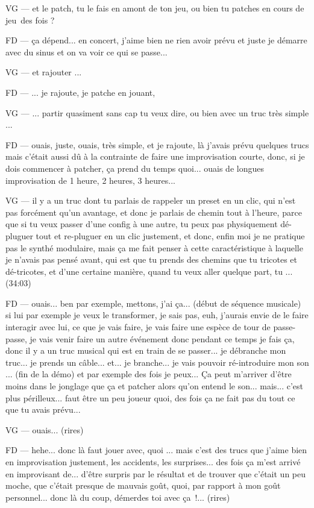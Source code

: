 VG — et le patch, tu le fais en amont de ton jeu, ou bien tu patches en cours de jeu des fois ? 

FD — ça dépend... en concert, j'aime bien ne rien avoir prévu et juste je démarre avec du sinus et on va voir ce qui se passe... 

VG — et rajouter ... 

FD — ... je rajoute, je patche en jouant,  

VG — ... partir quasiment sans cap tu veux dire, ou bien avec un truc très simple ... 

FD — ouais, juste, ouais, très simple, et je rajoute, là  j'avais prévu quelques trucs mais c'était aussi dû à la contrainte de faire une improvisation courte, donc, si je dois commencer à patcher, ça prend du temps quoi... ouais de longues improvisation de 1 heure, 2 heures, 3 heures... 

VG — il y a un truc dont tu parlais de rappeler un preset en un clic, qui n'est pas forcément qu'un avantage, et donc je parlais de chemin tout à l'heure, parce que si tu veux passer d'une config à une autre, tu peux pas physiquement dé-pluguer tout et re-pluguer en un clic justement, et donc, enfin moi je ne pratique pas le synthé modulaire, mais ça me fait penser à cette caractéristique à laquelle je n'avais pas pensé avant, qui est que tu prends des chemins que tu tricotes et dé-tricotes, et d'une certaine manière, quand tu veux aller quelque part, tu ... (34:03) 

FD — ouais... ben par exemple, mettons, j'ai ça... (début de séquence musicale) si lui par exemple je veux le transformer, je sais pas, euh, j'aurais envie de le faire interagir avec lui, ce que je vais faire, je vais faire une espèce de tour de passe-passe, je vais venir faire un autre événement donc pendant ce temps je fais ça, donc il y a un truc musical qui est en train de se passer... je débranche mon truc... je prends un câble... et... je branche... je vais pouvoir ré-introduire mon son ... (fin de la démo) et par exemple des fois je peux... Ça peut m'arriver d'être moins dans le jonglage que ça et patcher alors qu'on entend le son... mais... c'est plus périlleux... faut être un peu joueur quoi, des fois ça ne fait pas du tout ce que tu avais prévu... 

VG — ouais... (rires) 

FD — hehe... donc là faut jouer avec, quoi ... mais c'est des trucs que j'aime bien en improvisation justement, les accidents, les surprises... des fois ça m'est arrivé en improvisant de... d'être surpris par le résultat et de trouver que c'était un peu moche, que c'était presque de mauvais goût, quoi, par rapport à mon goût personnel... donc là du coup, démerdes toi avec ça !... (rires) 

